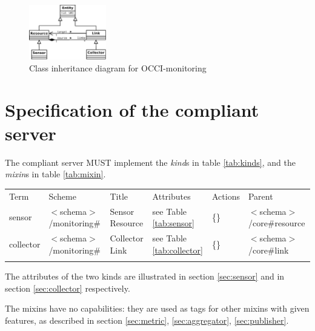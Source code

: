 \documentclass[10pt,a4paper]{article}
\begin{document}
\begin{figure}
\centering
\includegraphics[width=0.3\textwidth]{figs/Monitoring_UML.pdf}
\caption{Class inheritance diagram for OCCI-monitoring}
\end{figure}

\section{Specification of the compliant server}

The compliant server MUST implement the {\em kind}s in table \ref{tab:kinds}, and the {\em mixin}s in table \ref{tab:mixin}.

 {
        \begin{tabular}{llllll}
        \toprule
        Term & Scheme & Title & Attributes & Actions & Parent\\
        \colrule
        sensor &  $<$schema$>$/monitoring\# & Sensor Resource
        & see Table \ref{tab:sensor} & \{\} &  $<$schema$>$/core\#resource\\
        collector &  $<$schema$>$/monitoring\# & Collector Link
        & see Table \ref{tab:collector} & \{\} & $<$schema$>$/core\#link \\
        \botrule
        \end{tabular}
}

The attributes of the two kinds are illustrated in section \ref{sec:sensor} and in section \ref{sec:collector} respectively.

The mixins have no capabilities: they are used as tags for other mixins with given features, as described in section \ref{sec:metric}, \ref{sec:aggregator}, \ref{sec:publisher}.
\end{document}
